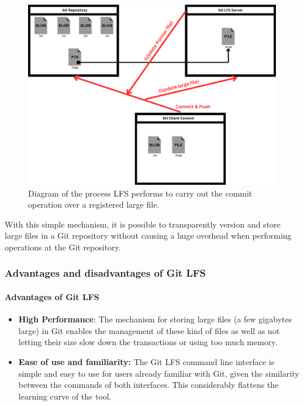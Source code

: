\begin{figure}[H]
    \centering
    \includegraphics[width=0.8\linewidth]{figs/lfs-commit.png}
    \caption{Diagram of the process LFS performs to carry out the commit operation over a registered large file.}
    \label{fig:LFSCommit}
\end{figure}

With this simple mechanism, it is possible to transparently version and store large files in a Git repository without causing a huge overhead when performing operations at 
the Git repository.

\newpage
\subsubsection{Advantages and disadvantages of Git LFS}

\paragraph{Advantages of Git LFS}

\begin{itemize}

    \item \textbf{High Performance}: The mechanism for storing large files (a few gigabytes large) in Git enables the management of these kind of files as well as not letting
    their size slow down the transactions or using too much memory.

    \item \textbf{Ease of use and familiarity: }The Git LFS command line interface is simple and easy to use for users already familiar with Git, given the similarity between 
    the commands of both interfaces. This considerably flattens the learning curve of the tool.
\end{itemize}

